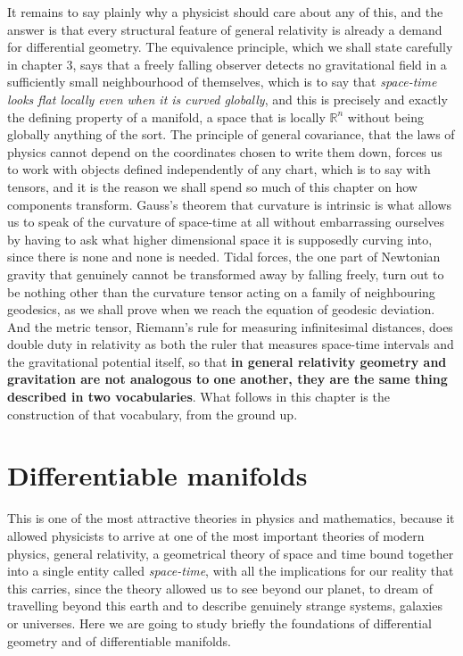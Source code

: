         It remains to say plainly why a physicist should care about any of this, and the answer is that every structural feature of general relativity is already a demand for differential geometry. The equivalence principle, which we shall state carefully in chapter 3, says that a freely falling observer detects no gravitational field in a sufficiently small neighbourhood of themselves, which is to say that \textit{space-time looks flat locally even when it is curved globally}, and this is precisely and exactly the defining property of a manifold, a space that is locally $\mathbb{R}^n$ without being globally anything of the sort. The principle of general covariance, that the laws of physics cannot depend on the coordinates chosen to write them down, forces us to work with objects defined independently of any chart, which is to say with tensors, and it is the reason we shall spend so much of this chapter on how components transform. Gauss's theorem that curvature is intrinsic is what allows us to speak of the curvature of space-time at all without embarrassing ourselves by having to ask what higher dimensional space it is supposedly curving into, since there is none and none is needed. Tidal forces, the one part of Newtonian gravity that genuinely cannot be transformed away by falling freely, turn out to be nothing other than the curvature tensor acting on a family of neighbouring geodesics, as we shall prove when we reach the equation of geodesic deviation. And the metric tensor, Riemann's rule for measuring infinitesimal distances, does double duty in relativity as both the ruler that measures space-time intervals and the gravitational potential itself, so that \textbf{in general relativity geometry and gravitation are not analogous to one another, they are the same thing described in two vocabularies}. What follows in this chapter is the construction of that vocabulary, from the ground up.

\section{Differentiable manifolds}

    This is one of the most attractive theories in physics and mathematics, because it allowed physicists to arrive at one of the most important theories of modern physics, general relativity, a geometrical theory of space and time bound together into a single entity called \textit{space-time}, with all the implications for our reality that this carries, since the theory allowed us to see beyond our planet, to dream of travelling beyond this earth and to describe genuinely strange systems, galaxies or universes. Here we are going to study briefly the foundations of differential geometry and of differentiable manifolds.

